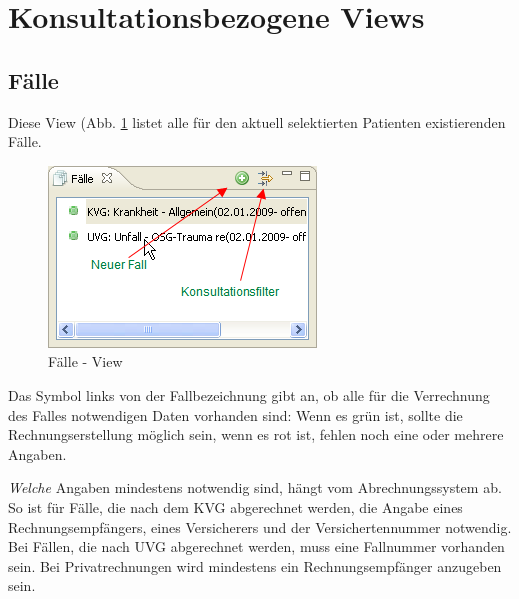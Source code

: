 

\section{Konsultationsbezogene Views}



\subsection{Fälle}
Diese View (Abb. \ref{fig:faelle2} listet alle für den aktuell selektierten
Patienten existierenden Fälle. 
\begin{figure}
  \includegraphics{images/faelleview}
  \caption{Fälle - View}
  \label{fig:faelle2}
\end{figure}

Das Symbol links von der Fallbezeichnung gibt an, ob alle für die Verrechnung
des Falles notwendigen Daten vorhanden sind: Wenn es grün ist, sollte die
Rechnungserstellung möglich sein, wenn es rot ist, fehlen noch eine oder mehrere
Angaben.

\textit{Welche} Angaben mindestens notwendig sind, hängt vom Abrechnungssystem ab. So ist für Fälle, die nach dem KVG abgerechnet werden, die Angabe
eines Rechnungsempfängers, eines Versicherers und der Versichertennummer
notwendig. Bei Fällen, die nach UVG abgerechnet werden, muss eine Fallnummer
vorhanden sein. Bei Privatrechnungen wird mindestens ein Rechnungsempfänger anzugeben sein.

